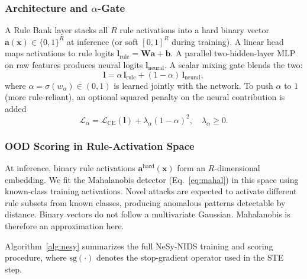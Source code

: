 \documentclass[journal]{IEEEtran}
\begin{document}
\subsubsection{Architecture and \texorpdfstring{$\alpha$}{alpha}-Gate}

A Rule Bank layer stacks all $R$ rule activations into a hard binary vector $\mathbf{a}(\mathbf{x})\in\{0,1\}^R$ at inference (or soft $[0,1]^R$ during training). A linear head maps activations to rule logits $\mathbf{l}_{\mathrm{rule}}{=}\mathbf{W}\mathbf{a}{+}\mathbf{b}$. A parallel two-hidden-layer MLP on raw features produces neural logits $\mathbf{l}_{\mathrm{neural}}$. A scalar mixing gate blends the two:
\begin{equation}
  \mathbf{l} = \alpha\,\mathbf{l}_{\mathrm{rule}} +
               (1{-}\alpha)\,\mathbf{l}_{\mathrm{neural}},
  \label{eq:alpha_gate}
\end{equation}
where $\alpha{=}\sigma(w_\alpha)\in(0,1)$ is learned jointly with the network. To push $\alpha$ to $1$ (more rule-reliant), an optional squared penalty on the neural contribution is added
\begin{equation}
  \mathcal{L}_\alpha = \mathcal{L}_{\mathrm{CE}}(\mathbf{l}) +
                       \lambda_\alpha(1{-}\alpha)^2,\quad \lambda_\alpha{\geq}0.
\end{equation}

\subsubsection{OOD Scoring in Rule-Activation Space}
At inference, binary rule activations $\mathbf{a}^{\mathrm{hard}}(\mathbf{x})$ form an $R$-dimensional embedding. We fit the Mahalanobis detector (Eq.~\ref{eq:mahal}) in this space using known-class training activations. Novel attacks are expected to activate different rule subsets from known classes, producing anomalous patterns detectable by distance. Binary vectors do not follow a multivariate Gaussian. Mahalanobis is therefore an approximation here.

Algorithm~\ref{alg:nesy} summarizes the full NeSy-NIDS training and scoring procedure, where $\mathrm{sg}(\cdot)$ denotes the stop-gradient operator used in the STE step.
\end{document}

